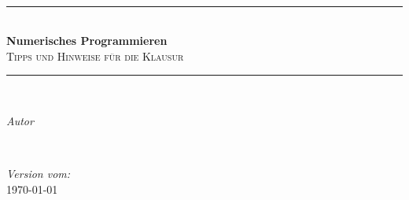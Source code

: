 
\begin{titlepage} %
	\newcommand{\HRule}{\rule{\linewidth}{0.5mm}} %
	
	\center %
	
	
	
	\hspace{1cm} \\[3.5cm]
	
	
	\HRule\\[0.4cm]
	
	{\huge\bfseries Numerisches Programmieren}\\[0.4cm] %
	
	\textsc{\Large Tipps und Hinweise für die Klausur}\\[0.5cm] %
	
	\HRule\\[1.5cm]
	
	
	\begin{minipage}{0.4\textwidth}
		\begin{flushleft}
			\large
			\textit{Autor}\\
			\textsc{\npauthor{}} %
		\end{flushleft}
	\end{minipage}
	~
	\begin{minipage}{0.4\textwidth}
		\begin{flushright}
			\large
			\textit{Version vom:}\\
			\textsc{\today} %
		\end{flushright}
	\end{minipage}
	
	

\end{titlepage}

